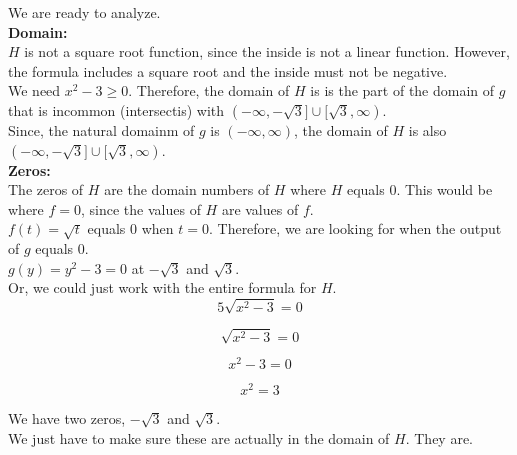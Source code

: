\documentclass{ximera}
\begin{document}
We are ready to analyze. \\




\textbf{\textcolor{blue!55!black}{Domain:}} \\


$H$ is not a square root function, since the inside is not a linear function.  However, the formula includes a square root and the inside must not be negative. \\

We need $x^2-3 \geq 0$.  Therefore, the domain of $H$ is is the part of the domain of $g$ that is incommon (intersectis) with $(-\infty, -\sqrt{3} ] \cup [ \sqrt{3}, \infty)$. \\

Since, the natural domainm of $g$ is $(-\infty, \infty)$, the domain of $H$ is also $(-\infty, -\sqrt{3} ] \cup [ \sqrt{3}, \infty)$. \\



\textbf{\textcolor{blue!55!black}{Zeros:}} \\


The zeros of $H$ are the domain numbers of $H$ where $H$ equals $0$.  This would be where $f = 0$, since the values of $H$ are values of $f$. \\



$f(t) = \sqrt{t}$ equals $0$ when $t = 0$. Therefore, we are looking for when the output of $g$ equals $0$. \\



$g(y) = y^2 - 3 = 0$ at $-\sqrt{3}$ and $\sqrt{3}$. \\



Or, we could just work with the entire formula for $H$. \\


\[
5 \sqrt{x^2-3} = 0
\]


\[
\sqrt{x^2-3} = 0
\]


\[
x^2-3 = 0
\]

\[
x^2 = 3
\]


We have two zeros, $-\sqrt{3}$ and $\sqrt{3}$. \\

We just have to make sure these are actually in the domain of $H$.  They are. \\
\end{document}
